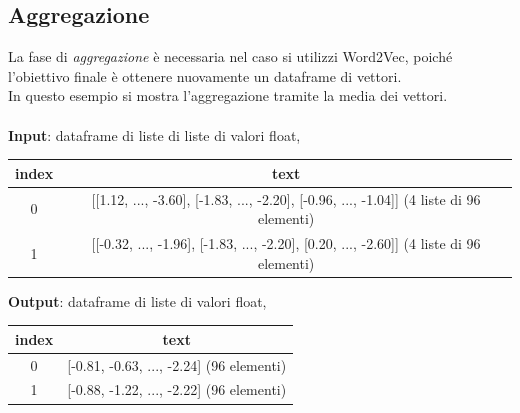\documentclass[12pt]{report}
\theoremstyle{definition}
\begin{document}
\subsection{Aggregazione}
La fase di \textit{aggregazione} è necessaria nel caso si utilizzi Word2Vec, poiché l'obiettivo finale è ottenere nuovamente un dataframe di vettori.
\\
In questo esempio si mostra l'aggregazione tramite la media dei vettori.
\\
\\
\textbf{Input}: dataframe di liste di liste di valori float,
\begin{center}
    \begin{tabular}{|c|c|}
    \hline
    \textbf{index} & \textbf{text} \\
    \hline
         0 & [[1.12, ..., -3.60], [-1.83, ..., -2.20], [-0.96, ..., -1.04]] (4 liste di 96 elementi) \\
         1 & [[-0.32, ..., -1.96], [-1.83, ..., -2.20], [0.20, ..., -2.60]] (4 liste di 96 elementi) \\
    \hline
    \end{tabular}
\end{center}
\textbf{Output}: dataframe di liste di valori float,
\begin{center}
    \begin{tabular}{|c|c|}
    \hline
    \textbf{index} & \textbf{text} \\
    \hline
         0 & [-0.81, -0.63, ..., -2.24] (96 elementi) \\
         1 & [-0.88, -1.22, ..., -2.22] (96 elementi) \\
    \hline
    \end{tabular}
\end{center}
\end{document}

